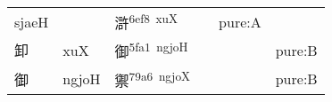 \documentclass[14pt,a4paper]{scrartcl}
\begin{document}
\begin{longtable}[c]{@{}llllll@{}}
\begin{minipage}[t]{0.14\columnwidth}
sjaeH
\strut\end{minipage} &
\begin{minipage}[t]{0.14\columnwidth}\raggedright\strut
\strut\end{minipage} &
\begin{minipage}[t]{0.14\columnwidth}\raggedright\strut
滸\textsuperscript{6ef8~xuX}
\strut\end{minipage} &
\begin{minipage}[t]{0.14\columnwidth}\raggedright\strut
\strut\end{minipage} &
\begin{minipage}[t]{0.14\columnwidth}\raggedright\strut
pure:A
\strut\end{minipage}\tabularnewline
\begin{minipage}[t]{0.14\columnwidth}\raggedright\strut
卸
\strut\end{minipage} &
\begin{minipage}[t]{0.14\columnwidth}\raggedright\strut
xuX
\strut\end{minipage} &
\begin{minipage}[t]{0.14\columnwidth}\raggedright\strut
御\textsuperscript{5fa1~ngjoH}
\strut\end{minipage} &
\begin{minipage}[t]{0.14\columnwidth}\raggedright\strut
\strut\end{minipage} &
\begin{minipage}[t]{0.14\columnwidth}\raggedright\strut
\strut\end{minipage} &
\begin{minipage}[t]{0.14\columnwidth}\raggedright\strut
pure:B
\strut\end{minipage}\tabularnewline
\begin{minipage}[t]{0.14\columnwidth}\raggedright\strut
御
\strut\end{minipage} &
\begin{minipage}[t]{0.14\columnwidth}\raggedright\strut
ngjoH
\strut\end{minipage} &
\begin{minipage}[t]{0.14\columnwidth}\raggedright\strut
禦\textsuperscript{79a6~ngjoX}
\strut\end{minipage} &
\begin{minipage}[t]{0.14\columnwidth}\raggedright\strut
\strut\end{minipage} &
\begin{minipage}[t]{0.14\columnwidth}\raggedright\strut
\strut\end{minipage} &
\begin{minipage}[t]{0.14\columnwidth}\raggedright\strut
pure:B
\strut\end{minipage}\tabularnewline
\bottomrule
\end{longtable}
\end{document}

